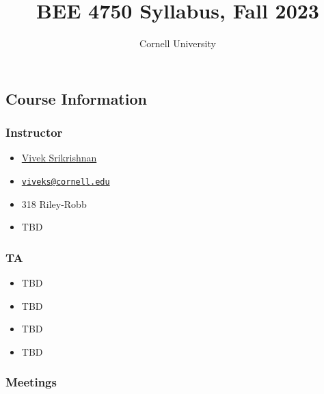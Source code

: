 \documentclass[
  letterpaper,
  DIV=11,
  numbers=noendperiod]{scrartcl}
\title{BEE 4750 Syllabus, Fall 2023}
\subtitle{Cornell University}
\author{}
\date{}
\providecommand{\tightlist}{%
  \setlength{\itemsep}{0pt}\setlength{\parskip}{0pt}}\usepackage{longtable,booktabs,array}
\renewcommand*\contentsname{Table of contents}
\newcommand\contentsname{Table of contents}
\begin{document}
\maketitle
\ifdefined\Shaded\renewenvironment{Shaded}{\begin{tcolorbox}[interior hidden, frame hidden, borderline west={3pt}{0pt}{shadecolor}, sharp corners, enhanced, boxrule=0pt, breakable]}{\end{tcolorbox}}\fi

\renewcommand*\contentsname{Table of contents}
{
\hypersetup{linkcolor=}
\setcounter{tocdepth}{2}
\tableofcontents
}
\hypertarget{course-information}{%
\subsection{Course Information}\label{course-information}}

\hypertarget{instructor}{%
\subsubsection{Instructor}\label{instructor}}

\begin{itemize}
\tightlist
\item
   {\href{https://viveks.me}{Vivek Srikrishnan}}
\item
  {\href{mailto:viveks@cornell.edu}{\nolinkurl{viveks@cornell.edu}}}
\item
   {318 Riley-Robb}
\item
   TBD
\end{itemize}

\hypertarget{ta}{%
\subsubsection{TA}\label{ta}}

\begin{itemize}
\tightlist
\item
   {TBD}
\item
   {TBD}
\item
   {TBD}
\item
   TBD
\end{itemize}

\hypertarget{meetings}{%
\subsubsection{Meetings}\label{meetings}}
\end{document}
